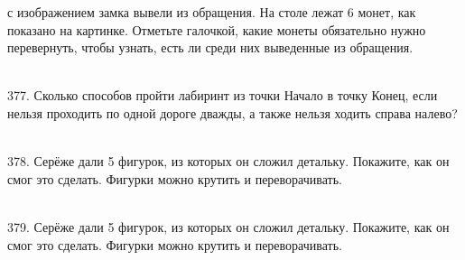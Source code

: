 \documentclass[12pt]{article}
\begin{document}
с изображением замка вывели из обращения. На столе лежат 6 монет, как показано на картинке.
Отметьте галочкой, какие монеты обязательно нужно перевернуть, чтобы узнать, есть ли среди них
выведенные из обращения.\\
\begin{figure}[ht!]
\end{figure}\\
377. Сколько способов пройти лабиринт из точки Начало в точку Конец, если нельзя проходить по одной дороге
дважды, а также нельзя ходить справа налево?\\
\begin{figure}[ht!]
\end{figure}\\
378. Серёже дали 5 фигурок, из которых он сложил детальку. Покажите, как он смог это сделать.
Фигурки можно крутить и переворачивать.\\
\begin{figure}[ht!]
\end{figure}\\
379. Серёже дали 5 фигурок, из которых он сложил детальку. Покажите, как он смог это сделать.
Фигурки можно крутить и переворачивать.\\
\begin{figure}[ht!]
\end{figure}\\
\end{document}
